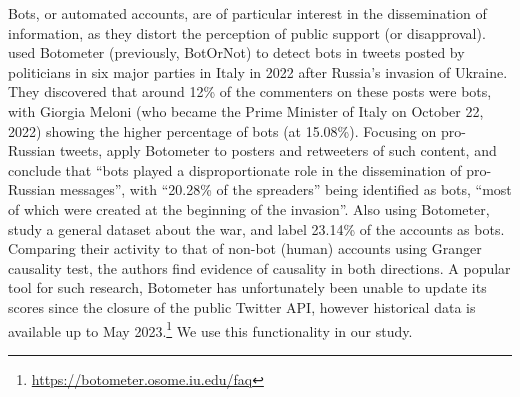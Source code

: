 Bots, or automated accounts, are of particular interest in the dissemination of information, as they distort the perception of public support (or disapproval).
\citet{de2023twitter} used Botometer (previously, BotOrNot) \cite{davis2016botornot} to detect bots in tweets posted by politicians in six major parties in Italy in 2022 after Russia's invasion of Ukraine. 
They discovered that around 12\% of the commenters on these posts were bots, with Giorgia Meloni (who became the Prime Minister of Italy on October 22, 2022) showing the higher percentage of bots (at 15.08\%).
Focusing on pro-Russian tweets, \citet{geissler2023russian} apply Botometer to posters and retweeters of such content, and conclude that ``bots played a disproportionate role in the dissemination of pro-Russian messages'', with ``20.28\% of the spreaders'' being identified as bots, ``most of which were created at the beginning of the invasion''.
Also using Botometer, \citet{zhao2024manufacturing} study a general dataset about the war, and label 23.14\% of the accounts as bots. 
Comparing their activity to that of non-bot (human) accounts using Granger causality test, the authors find evidence of causality in both directions. 
A popular tool for such research, Botometer has unfortunately been unable to update its scores since the closure of the public Twitter API, however historical data is available up to May 2023.\footnote{\url{https://botometer.osome.iu.edu/faq}}
We use this functionality in our study.


